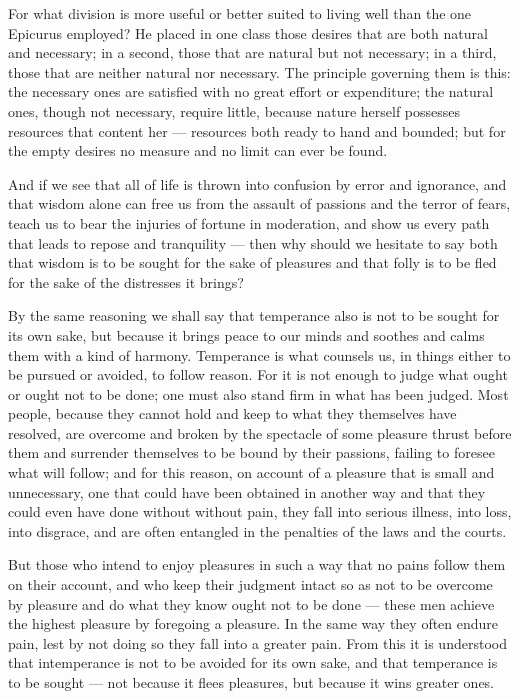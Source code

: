  For what division is more useful or better suited to living well than the one Epicurus employed? He placed in one class those desires that are both natural and necessary; in a second, those that are natural but not necessary; in a third, those that are neither natural nor necessary. The principle governing them is this: the necessary ones are satisfied with no great effort or expenditure; the natural ones, though not necessary, require little, because nature herself possesses resources that content her — resources both ready to hand and bounded; but for the empty desires no measure and no limit can ever be found.

 And if we see that all of life is thrown into confusion by error and ignorance, and that wisdom alone can free us from the assault of passions and the terror of fears, teach us to bear the injuries of fortune in moderation, and show us every path that leads to repose and tranquility — then why should we hesitate to say both that wisdom is to be sought for the sake of pleasures and that folly is to be fled for the sake of the distresses it brings?

 By the same reasoning we shall say that temperance also is not to be sought for its own sake, but because it brings peace to our minds and soothes and calms them with a kind of harmony. Temperance is what counsels us, in things either to be pursued or avoided, to follow reason. For it is not enough to judge what ought or ought not to be done; one must also stand firm in what has been judged. Most people, because they cannot hold and keep to what they themselves have resolved, are overcome and broken by the spectacle of some pleasure thrust before them and surrender themselves to be bound by their passions, failing to foresee what will follow; and for this reason, on account of a pleasure that is small and unnecessary, one that could have been obtained in another way and that they could even have done without without pain, they fall into serious illness, into loss, into disgrace, and are often entangled in the penalties of the laws and the courts.

 But those who intend to enjoy pleasures in such a way that no pains follow them on their account, and who keep their judgment intact so as not to be overcome by pleasure and do what they know ought not to be done — these men achieve the highest pleasure by foregoing a pleasure. In the same way they often endure pain, lest by not doing so they fall into a greater pain. From this it is understood that intemperance is not to be avoided for its own sake, and that temperance is to be sought — not because it flees pleasures, but because it wins greater ones.

